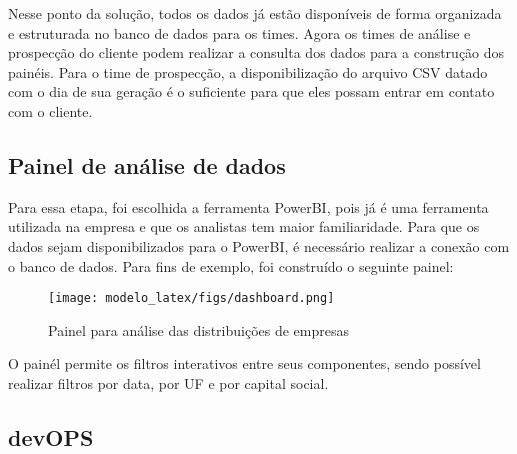 Nesse ponto da solução, todos os dados já estão disponíveis de forma organizada e estruturada no banco de dados para os times. Agora os times de análise e prospecção do cliente podem realizar a consulta dos dados para a construção dos painéis. Para o time de prospecção, a disponibilização do arquivo CSV datado com o dia de sua geração é o suficiente para que eles possam entrar em contato com o cliente.

\subsection{Painel de análise de dados}

Para essa etapa, foi escolhida a ferramenta PowerBI, pois já é uma ferramenta utilizada na empresa e que os analistas tem maior familiaridade.
Para que os dados sejam disponibilizados para o PowerBI, é necessário realizar a conexão com o banco de dados. Para fins de exemplo, foi construído o seguinte painel:

\begin{figure}[H]
    \centering
    \texttt{[image: modelo\_latex/figs/dashboard.png]}
    \caption{Painel para análise das distribuições de empresas}
    \label{fig:dashboard}
\end{figure}

O painél permite os filtros interativos entre seus componentes, sendo possível realizar filtros por data, por UF e por capital social.

\subsection{devOPS}
